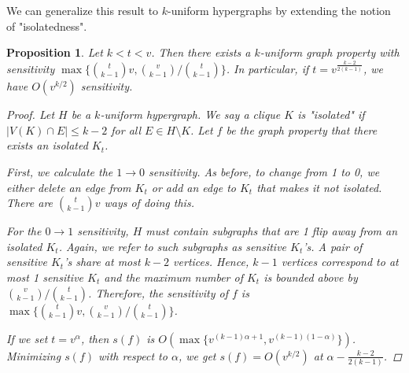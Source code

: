 \documentclass[psamsfonts]{amsart}
\newtheorem{prop}[thm]{Proposition}
\theoremstyle{definition}
\theoremstyle{remark}
\numberwithin{equation}{section}
\begin{document}
We can generalize this result to $k$-uniform hypergraphs by extending the notion of "isolatedness".

\begin{prop} Let $k < t < v$. Then there exists a $k$-uniform graph property with sensitivity $\max \{ {t \choose k-1}v, {v \choose k-1}/{t \choose k-1}\}$. In particular, if $t = v^{\frac {k-2} {2(k-1)}}$, we have $O(v^{k/2})$ sensitivity.

\begin{proof}
Let $H$ be a $k$-uniform hypergraph. We say a clique $K$ is "isolated" if $|V(K) \cap E| \leq k-2$ for all $E \in H\setminus K$. Let $f$ be the graph property that there exists an isolated $K_t$.

First, we calculate the $1 \rightarrow 0$ sensitivity. As before, to change from 1 to 0, we either delete an edge from $K_t$ or add an edge to $K_t$ that makes it not isolated. There are ${t \choose k-1}v$ ways of doing this.

For the $0 \rightarrow 1$ sensitivity, $H$ must contain subgraphs that are 1 flip away from an isolated $K_t$. Again, we refer to such subgraphs as sensitive $K_t$'s. A pair of sensitive $K_t$'s share at most $k-2$ vertices. Hence, $k-1$ vertices correspond to at most 1 sensitive $K_t$ and the maximum number of $K_t$ is bounded above by ${v \choose k-1}/{t \choose k-1}$. Therefore, the sensitivity of $f$ is $\max \{ {t \choose k-1}v, {v \choose k-1}/{t \choose k-1}\}$.

If we set $t = v^\alpha$, then $s(f)$ is $O(\max \{ v^{(k-1)\alpha + 1}, v^{(k-1)(1-\alpha)}\})$. Minimizing $s(f)$ with respect to $\alpha$, we get $s(f) = O(v^{k/2})$ at $\alpha - \frac {k-2}{2(k-1)}$.

\end{proof}

\end{prop}
\end{document}
